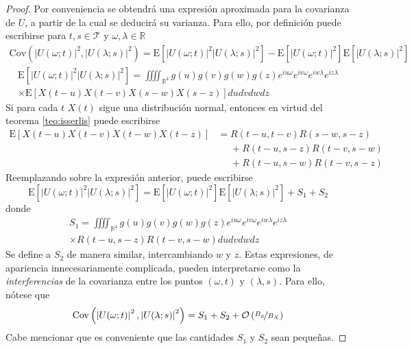 \documentclass[12pt,letterpaper,draft]{book}
\newcommand{\R}{\mathbb{R}}
\newcommand{\E}[1]{\mathrm{E}\left[ #1 \right]}
\newcommand{\Cov}[1]{\mathrm{Cov}\left( #1 \right)}
\newcommand{\abso}[1]{\left| #1 \right|}
\newcommand{\orden}[1]{\mathcal{O}\left( #1 \right)}
\newcommand{\pheq}{\phantom{=}}
\begin{document}

\begin{proof}
Por conveniencia se obtendrá una expresión aproximada para la covarianza de $U$, a partir de la cual se deducirá su varianza. 
%
Para ello, por definición puede escribirse para $t,s \in \mathcal{T}$ y $\omega, \lambda \in \R$
\begin{align*}
\Cov{\abso{U(\omega;t)}^{2},\abso{U(\lambda;s)}^{2}} =
\E{\abso{U(\omega;t)}^{2} \abso{U(\lambda;s)}^{2}} - 
\E{\abso{U(\omega;t)}^{2}} \E{\abso{U(\lambda;s)}^{2}}
\end{align*}
\begin{multline}
\E{\abso{U(\omega;t)}^{2} \abso{U(\lambda;s)}^{2}}
=
\iiiint_{\R^{4}} g(u) g(v) g(w) g(z) e^{i u \omega} e^{i v \omega} e^{i w \lambda} e^{i z \lambda} \\
 \times
\E{{X(t-u)} {X(t-v)} {X(s-w)} {X(s-z)}}
du dv dw dz 
\end{multline}
Si para cada $t$ $X(t)$ sigue una distribución normal, entonces en virtud del teorema \ref{teo:isserlis} puede escribirse
\begin{align*}
\E{X(t-u) {X(t-v)} {X(t-w)} X(t-z)} 
&=       R(t-u,t-v)R(s-w,s-z) \\
&\pheq + R(t-u,s-z)R(t-v,s-w) \\
&\pheq + R(t-u,s-w)R(t-v,s-z)
\end{align*}
Reemplazando sobre la expresión anterior, puede escribirse
\begin{equation}
\E{\abso{U(\omega;t)}^{2} \abso{U(\lambda;s)}^{2}} = \E{\abso{U(\omega;t)}^{2}} \E{\abso{U(\lambda;s)}^{2}}+ S_1 + S_2
\end{equation}
donde
\begin{multline*}
S_1 = \iiiint_{\R^{4}} g(u) g(v) g(w) g(z) e^{i u \omega} e^{i v \omega} e^{i w \lambda} e^{i z \lambda} \\
\times
R(t-u,s-z)R(t-v,s-w)
du dv dw dz 
\end{multline*}
Se define a $S_2$ de manera similar, intercambiando $w$ y $z$. 
%
Estas expresiones, de apariencia innecesariamente complicada, pueden interpretarse como la \textit{interferencias} de la covarianza entre los puntos $(\omega, t)$ y $(\lambda,s)$.
%
Para ello, nótese que
\begin{equation}
\Cov{\abso{U(\omega;t)}^{2},\abso{U(\lambda;s)}^{2}} = S_1 + S_2 + \orden{\nicefrac{B_g}{B_X}}
\end{equation}
%
Cabe mencionar que es conveniente que las cantidades $S_1$ y $S_2$ sean pequeñas.


\end{proof}
\end{document}
